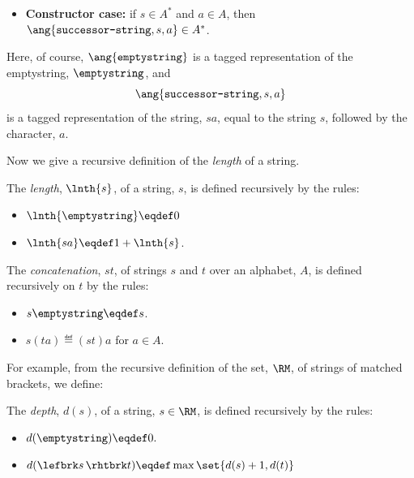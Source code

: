 \begin{definition}
\begin{definition}
\begin{itemize}
\item \textbf{Constructor case:} if $s \in A^*$ and $a \in A$, then
$\ang{\texttt{successor-string},s,a}\in A^*$.

\end{itemize}
\end{definition}
Here, of course, $\ang{\texttt{emptystring}}$ is a tagged representation
of the emptystring, $\emptystring$, and
\[
\ang{\texttt{successor-string}, s, a}
\]
is a tagged representation of the string, $sa$, equal to the string $s$,
followed by the character, $a$.

Now we give a recursive definition of the \emph{length} of a string.
\begin{definition}
The \emph{length}, $\lnth{s}$, of a string, $s$, is defined recursively by
the rules:
\begin{itemize}
\item $\lnth{\emptystring} \eqdef 0$
\item $\lnth{sa} \eqdef 1+\lnth{s}$.
\end{itemize}
\end{definition}

\begin{definition}
The \emph{concatenation}, $st$, of strings $s$ and $t$ over an alphabet,
$A$, is defined recursively on $t$ by the rules:
\begin{itemize}
\item $s\emptystring \eqdef s$.
\item $s(ta) \eqdef (st)a$ for $a \in A$.
\end{itemize}
\end{definition}
\fi

For example, from the recursive definition of the set, $\RM$, of strings of
matched brackets, we define:
\begin{definition}
The \emph{depth}, $d(s)$, of a string, $s \in\RM$, is defined
recursively by the rules:
\begin{itemize}
\item $d(\emptystring) \eqdef 0.$
\item $d(\lefbrk s\,\rhtbrk t)
    \eqdef \max \set{d(s) + 1, d(t)}$
\end{itemize}
\end{definition}



\end{definition}
